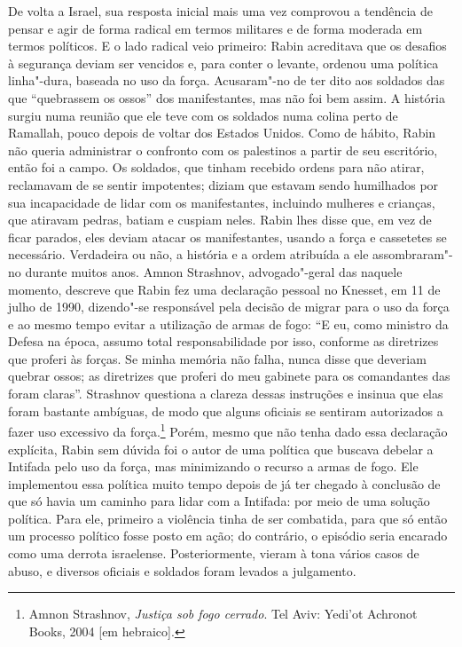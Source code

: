 De volta a Israel, sua resposta inicial mais uma vez comprovou a
tendência de pensar e agir de forma radical em termos militares e de
forma moderada em termos políticos. E o lado radical veio primeiro: Rabin
acreditava que os desafios à segurança deviam ser vencidos e, para
conter o levante, ordenou uma política linha"-dura, baseada no uso da
força. Acusaram"-no de ter dito aos soldados das  que ``quebrassem os
ossos'' dos manifestantes, mas não foi bem assim. A história surgiu numa
reunião que ele teve com os soldados numa colina perto de Ramallah,
pouco depois de voltar dos Estados Unidos. Como de hábito, Rabin não
queria administrar o confronto com os palestinos a partir de seu
escritório, então foi a campo. Os soldados, que tinham recebido ordens
para não atirar, reclamavam de se sentir impotentes; diziam que estavam
sendo humilhados por sua incapacidade de lidar com os manifestantes,
incluindo mulheres e crianças, que atiravam pedras, batiam e cuspiam
neles. Rabin lhes disse que, em vez de ficar parados, eles deviam atacar os
manifestantes, usando a força e cassetetes se necessário. Verdadeira ou
não, a história e a ordem atribuída a ele assombraram"-no durante muitos
anos. Amnon Strashnov, advogado"-geral das  naquele momento, descreve
que Rabin fez uma declaração pessoal no Knesset, em 11 de julho de 1990,
dizendo"-se responsável pela decisão de migrar para o uso da força e ao
mesmo tempo evitar a utilização de armas de fogo: ``E eu, como ministro
da Defesa na época, assumo total responsabilidade por isso, conforme as
diretrizes que proferi às forças. Se minha memória não falha, nunca
disse que deveriam quebrar ossos; as diretrizes que proferi do meu
gabinete para os comandantes das  foram claras''. Strashnov questiona
a clareza dessas instruções e insinua que elas foram bastante ambíguas,
de modo que alguns oficiais se sentiram autorizados a fazer uso
excessivo da força.\footnote{Amnon Strashnov, \emph{Justiça sob fogo cerrado}.
  Tel Aviv: Yedi'ot Achronot Books, 2004 {[}em hebraico{]}.} Porém, mesmo
que não tenha dado essa declaração explícita, Rabin sem dúvida foi o
autor de uma política que buscava debelar a Intifada pelo uso da força,
mas minimizando o recurso a armas de fogo. Ele implementou
essa política muito tempo depois de já ter chegado à conclusão de que só
havia um caminho para lidar com a Intifada: por meio de uma solução
política. Para ele, primeiro a violência tinha de ser combatida, para
que só então um processo político fosse posto em ação; do contrário, o
episódio seria encarado como uma derrota israelense. Posteriormente,
vieram à tona vários casos de abuso, e diversos oficiais e soldados
foram levados a julgamento.

